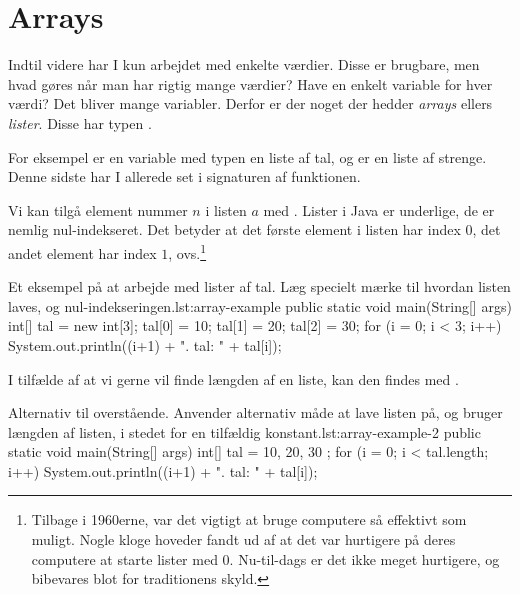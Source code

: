 \section{Arrays}

    Indtil videre har I kun arbejdet med enkelte værdier. Disse er
    brugbare, men hvad gøres når man har rigtig mange værdier? Have
    en enkelt variable for hver værdi? Det bliver mange variabler.
    Derfor er der noget der hedder \emph{arrays} ellers \emph{lister}.
    Disse har typen .

    For eksempel er en variable med typen  en liste
    af tal, og  er en liste af strenge. Denne
    sidste har I allerede set i signaturen af 
    funktionen.

    Vi kan tilgå element nummer \(n\) i listen \(a\) med
    .  Lister i Java er underlige, de er nemlig
    nul-indekseret. Det betyder at det første element i listen har
    index \(0\), det andet element har index \(1\),
    ovs.\footnote{Tilbage i 1960erne, var det vigtigt at bruge
    computere så effektivt som muligt. Nogle kloge hoveder
    fandt ud af at det var hurtigere på deres computere at starte
    lister med 0. Nu-til-dags er det ikke meget hurtigere, og
    bibevares blot for traditionens skyld.}

    \begin{JavaCode}{Et eksempel på at arbejde med lister af tal. Læg specielt mærke til hvordan listen laves, og nul-indekseringen.}{lst:array-example}
        public static void main(String[] args) {
            int[] tal = new int[3];
            tal[0] = 10;
            tal[1] = 20;
            tal[2] = 30;
            for (i = 0; i < 3; i++) {
                System.out.println((i+1) + ". tal: "
                                         + tal[i]);
            }
        }
    \end{JavaCode}

    I tilfælde af at vi gerne vil finde længden af en liste, kan den findes med
    .

    \begin{JavaCode}{Alternativ til overstående. Anvender alternativ måde at lave listen på, og bruger længden af listen, i stedet for en tilfældig konstant.}{lst:array-example-2}
        public static void main(String[] args) {
            int[] tal = { 10, 20, 30 };
            for (i = 0; i < tal.length; i++) {
                System.out.println((i+1) + ". tal: "
                                         + tal[i]);
            }
        }
    \end{JavaCode}

